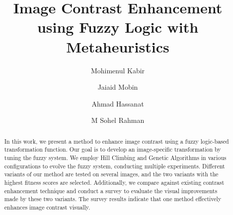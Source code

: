\documentclass[sigconf]{acmart}
\begin{document}
\title{Image Contrast Enhancement using Fuzzy Logic with Metaheuristics}

\author{Mohimenul Kabir}

\author{Jaiaid Mobin}

\author{Ahmad Hassanat}

\author{M Sohel Rahman}

\renewcommand{\shortauthors}{Kabir et al.}

\begin{abstract}
  In this work, we present a method to enhance image contrast using a fuzzy logic-based transformation function. 
  Our goal is to develop an image-specific transformation by tuning the fuzzy system. 
  We employ Hill Climbing and Genetic Algorithms in various configurations to evolve the fuzzy system, conducting multiple experiments. 
  Different variants of our method are tested on several images, and the two variants with the highest fitness scores are selected. 
  Additionally, we compare against existing contrast enhancement technique and conduct a survey to evaluate the visual improvements made by these two variants. 
  The survey results indicate that one method effectively enhances image contrast visually.
\end{abstract}
\end{document}
